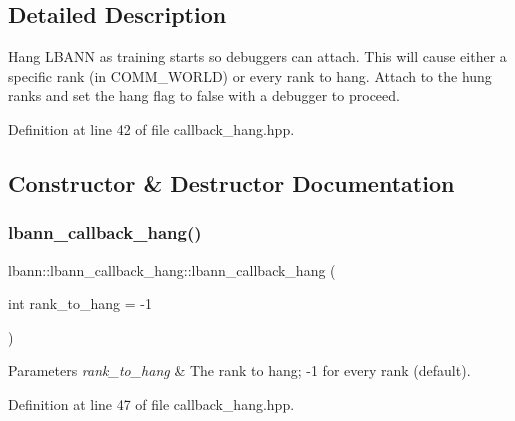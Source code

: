 \subsection{Detailed Description}
Hang L\+B\+A\+NN as training starts so debuggers can attach. This will cause either a specific rank (in C\+O\+M\+M\+\_\+\+W\+O\+R\+LD) or every rank to hang. Attach to the hung ranks and set the hang flag to false with a debugger to proceed. 

Definition at line 42 of file callback\+\_\+hang.\+hpp.



\subsection{Constructor \& Destructor Documentation}
\mbox{\label{classlbann_1_1lbann__callback__hang_af5e29a2d416e3268a495df8370b272b6}} 
\subsubsection{\texorpdfstring{lbann\+\_\+callback\+\_\+hang()}{lbann\_callback\_hang()}\hspace{0.1cm}{\footnotesize\ttfamily [1/2]}}
{\footnotesize\ttfamily lbann\+::lbann\+\_\+callback\+\_\+hang\+::lbann\+\_\+callback\+\_\+hang (\begin{DoxyParamCaption}\item[{int}]{rank\+\_\+to\+\_\+hang = {\ttfamily -\/1} }\end{DoxyParamCaption})\hspace{0.3cm}{\ttfamily [inline]}}


\begin{DoxyParams}{Parameters}
{\em rank\+\_\+to\+\_\+hang} & The rank to hang; -\/1 for every rank (default). \\
\hline
\end{DoxyParams}


Definition at line 47 of file callback\+\_\+hang.\+hpp.


